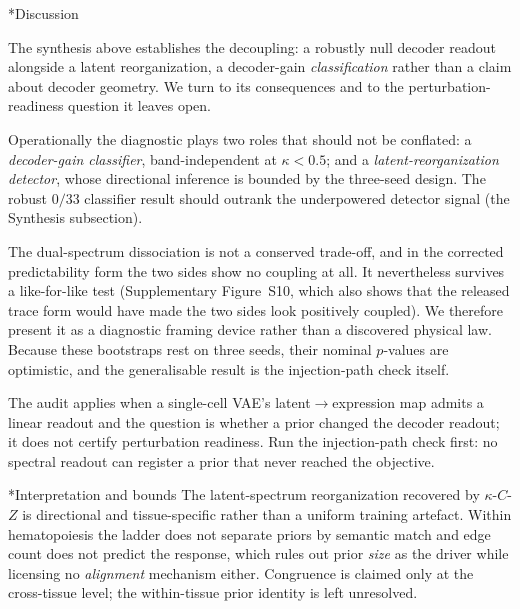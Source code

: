 \documentclass[11pt,a4paper]{article}
\makeatletter
\renewcommand{\section}{\@startsection{section}{1}{0pt}{12pt plus 6pt}{6pt}{\large\bfseries}}
\renewcommand{\subsection}{\@startsection{subsection}{2}{0pt}{10pt plus 4pt}{4pt}{\normalsize\bfseries}}
\makeatother
\begin{document}
\section*{Discussion}

The synthesis above establishes the decoupling: a robustly null decoder readout alongside a
latent reorganization, a decoder-gain \emph{classification} rather than a claim about decoder
geometry. We turn to its consequences and to the perturbation-readiness question it leaves
open.

Operationally the diagnostic plays two roles that should not be conflated: a \emph{decoder-gain
classifier}, band-independent at $\kappa<0.5$; and a \emph{latent-reorganization detector},
whose directional inference is bounded by the three-seed design. The robust $0/33$ classifier
result should outrank the underpowered detector signal (the Synthesis subsection).

The dual-spectrum dissociation is not a conserved trade-off, and in the corrected predictability form the two sides show no coupling at all. It nevertheless survives a like-for-like test (Supplementary Figure~S10, which also shows that the released trace form would have made the two sides look positively coupled). We therefore present it as a diagnostic framing device rather than a discovered physical law. Because these
bootstraps rest on three seeds, their nominal $p$-values are optimistic, and the generalisable
result is the injection-path check itself.

The audit applies when a single-cell VAE's latent$\to$expression map admits a linear readout and
the question is whether a prior changed the decoder readout; it does not certify perturbation
readiness. Run the injection-path check first: no spectral readout can register a prior that
never reached the objective.

\subsection*{Interpretation and bounds}
The latent-spectrum reorganization recovered by $\kappa$-$C$-$Z$ is directional and
tissue-specific rather than a uniform training artefact. Within hematopoiesis the ladder does not
separate priors by semantic match and edge count does not predict the response, which rules out
prior \emph{size} as the driver while licensing no \emph{alignment} mechanism either. Congruence
is claimed only at the cross-tissue level; the within-tissue prior identity is left unresolved.
\end{document}

